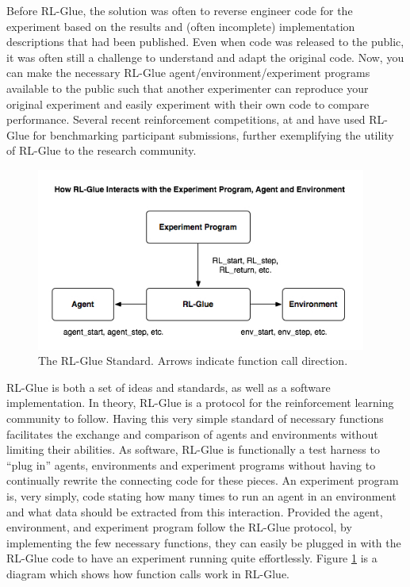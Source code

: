 \documentclass[11pt]{article}
\begin{document}
Before RL-Glue, the solution was often to reverse engineer code for the experiment based on the results and (often incomplete) implementation descriptions that had been published.  Even when code was released to the public, it was often still a challenge to understand and adapt the original code. Now, you can make the necessary RL-Glue agent/environment/experiment programs  available to the public such that another experimenter can reproduce your original experiment and easily experiment with their own code to compare performance.  Several recent reinforcement competitions, at  and  have used RL-Glue for benchmarking participant submissions, further exemplifying the utility of RL-Glue to the research community.
 
\begin{figure}
	\begin{centering}
\includegraphics[height=60mm]{images/glue_connections_no_shadow.png}
\caption{The RL-Glue Standard. Arrows indicate function call direction.}
\label{fig:glue-connections}
\end{centering}
\end{figure}

RL-Glue is both a set of ideas and standards, as well as a software implementation. In theory, RL-Glue is a protocol for the reinforcement learning community to follow. Having this very simple standard of necessary functions facilitates the exchange and comparison of agents and environments without limiting their abilities. As software, RL-Glue is functionally a test harness to ``plug in'' agents, environments and experiment programs without having to continually rewrite the connecting code for these pieces. An experiment program is, very simply, code stating how many times to run an agent in an environment and what data should be extracted from this interaction. Provided the agent, environment, and experiment program follow the RL-Glue protocol, by implementing the few necessary functions, they can easily be plugged in with the RL-Glue code to have an experiment running quite effortlessly. Figure \ref{fig:glue-connections} is a diagram which shows how function calls work in RL-Glue.
\end{document}

